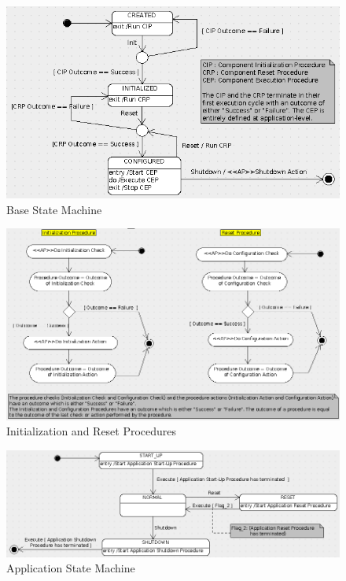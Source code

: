 \documentclass[a4paper,10pt]{article}
\begin{document}
\begin{figure}[h]
 \centering
 \includegraphics[scale=0.3,keepaspectratio=true]{BaseSM.png}
 \caption{Base State Machine}
 \label{fig:BaseSM}
\end{figure}

\begin{figure}[h]
 \centering
 \includegraphics[scale=0.3,keepaspectratio=true]{InitializationAndReset.png}
 \caption{Initialization and Reset Procedures}
 \label{fig:InitializationAndReset}
\end{figure}

\begin{figure}[h]
 \centering
 \includegraphics[scale=0.38,keepaspectratio=true]{ApplicationSM.png}
 \caption{Application State Machine}
 \label{fig:ApplicationSM}
\end{figure}
\end{document}

